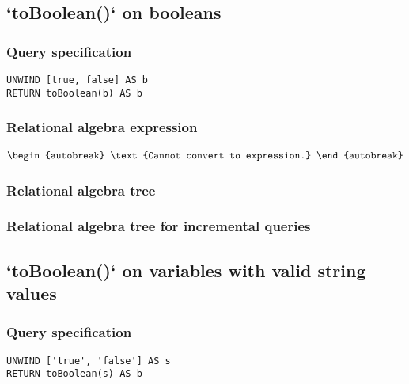 \subsection{`toBoolean()` on booleans}

\subsubsection*{Query specification}

\begin{lstlisting}
UNWIND [true, false] AS b
RETURN toBoolean(b) AS b
\end{lstlisting}

\subsubsection*{Relational algebra expression}

\begin{align*}
\begin{autobreak}
\text{Cannot convert to expression.}
\end{autobreak}
\end{align*}

\subsubsection*{Relational algebra tree}


\subsubsection*{Relational algebra tree for incremental queries}


\subsection{`toBoolean()` on variables with valid string values}

\subsubsection*{Query specification}

\begin{lstlisting}
UNWIND ['true', 'false'] AS s
RETURN toBoolean(s) AS b
\end{lstlisting}

